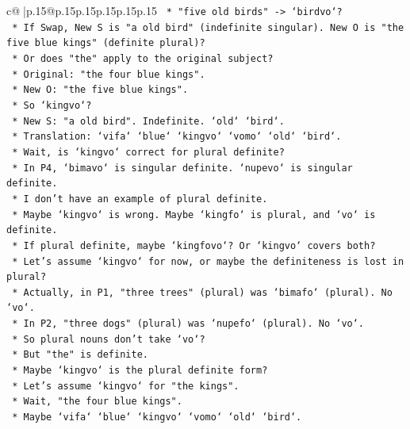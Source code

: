 \documentclass{article}
\begin{document}
{\begin{supertabular}{c@{$\;$}|p{.15\linewidth}@{}p{.15\linewidth}p{.15\linewidth}p{.15\linewidth}p{.15\linewidth}p{.15\linewidth}}
{{{\texttt{            *   "five old birds" {-}> `birdvo`?} \\
\texttt{            *   If Swap, New S is "a old bird" (indefinite singular). New O is "the five blue kings" (definite plural)?} \\
\texttt{            *   Or does "the" apply to the original subject?} \\
\texttt{            *   Original: "the four blue kings".} \\
\texttt{            *   New O: "the five blue kings".} \\
\texttt{            *   So `kingvo`?} \\
\texttt{            *   New S: "a old bird". Indefinite. `old` `bird`.} \\
\texttt{            *   Translation: `vifa` `blue` `kingvo` `vomo` `old` `bird`.} \\
\texttt{            *   Wait, is `kingvo` correct for plural definite?} \\
\texttt{            *   In P4, `bimavo` is singular definite. `nupevo` is singular definite.} \\
\texttt{            *   I don't have an example of plural definite.} \\
\texttt{            *   Maybe `kingvo` is wrong. Maybe `kingfo` is plural, and `vo` is definite.} \\
\texttt{            *   If plural definite, maybe `kingfovo`? Or `kingvo` covers both?} \\
\texttt{            *   Let's assume `kingvo` for now, or maybe the definiteness is lost in plural?} \\
\texttt{            *   Actually, in P1, "three trees" (plural) was `bimafo` (plural). No `vo`.} \\
\texttt{            *   In P2, "three dogs" (plural) was `nupefo` (plural). No `vo`.} \\
\texttt{            *   So plural nouns don't take `vo`?} \\
\texttt{            *   But "the" is definite.} \\
\texttt{            *   Maybe `kingvo` is the plural definite form?} \\
\texttt{            *   Let's assume `kingvo` for "the kings".} \\
\texttt{            *   Wait, "the four blue kings".} \\
\texttt{            *   Maybe `vifa` `blue` `kingvo` `vomo` `old` `bird`.} \\
\\ 
}}}
\end{supertabular}}
\end{document}
